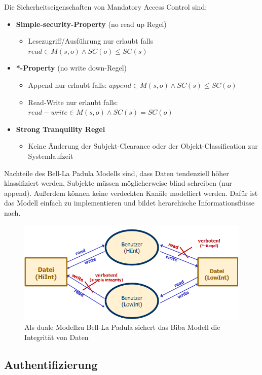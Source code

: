 \documentclass[a4paper,12pt,leqno]{article}
\begin{document}
Die Sicherheitseigenschaften von Mandatory Access Control sind:
\begin{itemize}
\item \textbf{Simple-security-Property} (no read up Regel)
	\begin{itemize}
	\item Lesezugriff/Ausführung nur erlaubt falls $read\in M(s,o)\wedge SC(o)\leq SC(s)$
	\end{itemize}
\item \textbf{*-Property} (no write down-Regel)
	\begin{itemize}
	\item Append nur erlaubt falls: $append\in M(s,o)\wedge SC(s)\leq SC(o)$
	\item Read-Write nur erlaubt falls: $read-write \in M(s,o)\wedge SC(s)=SC(o)$
	\end{itemize}
\item \textbf{Strong Tranquility Regel}
	\begin{itemize}
	\item Keine Änderung der Subjekt-Clearance oder der Objekt-Classification zur Systemlaufzeit
	\end{itemize}
\end{itemize}
Nachteile des Bell-La Padula Modells sind, dass Daten tendenziell höher klassifiziert werden, Subjekte müssen möglicherweise blind schreiben (nur append). Außerdem können keine verdeckten Kanäle modelliert werden.
Dafür ist das Modell einfach zu implementieren und bildet herarchische Informationsflüsse nach.
\begin{figure}
\centering
\includegraphics[scale=0.8]{Grafiken/BibaModell-MAC.png}
\caption{Als duale Modellzu Bell-La Padula sichert das Biba Modell die Integrität von Daten}
\end{figure}
\subsection{Authentifizierung}
\end{document}
